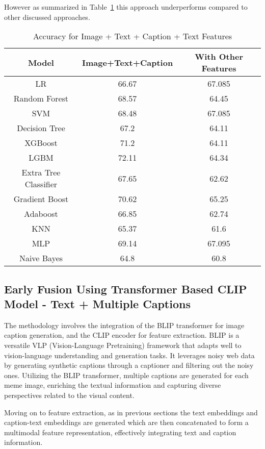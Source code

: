 \documentclass{ieeeaccess}
\begin{document}
However as summarized in Table~\ref{tab:image_text_caption_features_accuracy} this approach underperforms compared to other discussed approaches.

\begin{table}[htbp]
\caption{Accuracy for Image + Text + Caption + Text Features}
\label{tab:image_text_caption_features_accuracy}
\centering
\begin{tabular}{|c|c|c|}
\hline
\textbf{Model} & \textbf{Image+Text+Caption} & \textbf{With Other Features} \\
\hline
LR & 66.67 & 67.085 \\
Random Forest & 68.57 & 64.45 \\
SVM & 68.48 & 67.085 \\
Decision Tree & 67.2 & 64.11 \\
XGBoost & 71.2 & 64.11 \\
LGBM & 72.11 & 64.34 \\
Extra Tree Classifier & 67.65 & 62.62 \\
Gradient Boost & 70.62 & 65.25 \\
Adaboost & 66.85 & 62.74 \\
KNN & 65.37 & 61.6 \\
MLP & 69.14 & 67.095 \\
Naive Bayes & 64.8 & 60.8 \\
\hline
\end{tabular}
\end{table}

\subsection{Early Fusion Using Transformer Based CLIP Model - Text + Multiple Captions}

The methodology involves the integration of the BLIP transformer for image caption generation, and the CLIP encoder for feature extraction. BLIP is a versatile VLP (Vision-Language Pretraining) framework that adapts well to vision-language understanding and generation tasks. It leverages noisy web data by generating synthetic captions through a captioner and filtering out the noisy ones. Utilizing the BLIP transformer, multiple captions are generated for each meme image, enriching the textual information and capturing diverse perspectives related to the visual content.

Moving on to feature extraction, as in previous sections the text embeddings and caption-text embeddings are generated which are then concatenated to form a multimodal feature representation, effectively integrating text and caption information.
\end{document}
